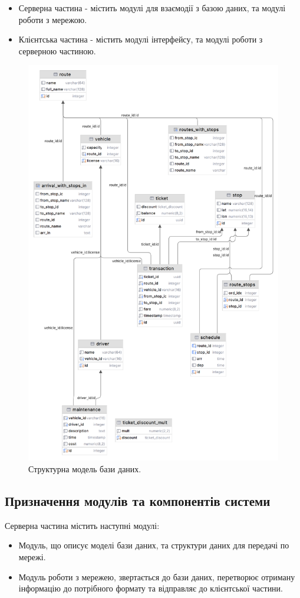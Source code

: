 \documentclass[oneside,14pt]{extarticle}
\begin{document}
\begin{itemize}
\item Серверна частина - містить модулі для взаємодії з базою даних, та модулі роботи з мережою.
\item Клієнтська частина - містить модулі інтерфейсу, та модулі роботи з серверною частиною.
\end{itemize}

\begin{figure}[H]
	\centering
	\includegraphics[scale=0.15]{schema}
	\caption{Структурна модель бази даних.}
\end{figure}

\subsection{Призначення модулів та компонентів системи}
Серверна частина містить наступні модулі:
\begin{itemize}
\item Модуль, що описує моделі бази даних, та структури даних для передачі по мережі.
\item Модуль роботи з мережею, звертається до бази даних, перетворює отриману інформацію до потрібного формату та відправляє до клієнтської частини.
\end{itemize}
\end{document}
